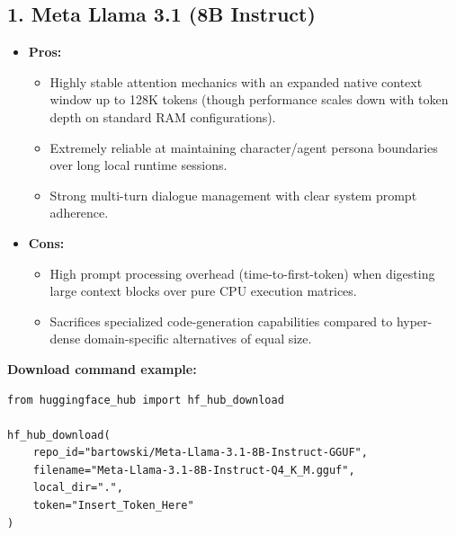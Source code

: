 \documentclass{article}
\begin{document}
\vspace{0.5cm}

\subsection*{1. Meta Llama 3.1 (8B Instruct)}
\begin{itemize}
    \item \textbf{Pros:}
    \begin{itemize}
        \item Highly stable attention mechanics with an expanded native context window up to 128K tokens (though performance scales down with token depth on standard RAM configurations).
        \item Extremely reliable at maintaining character/agent persona boundaries over long local runtime sessions.
        \item Strong multi-turn dialogue management with clear system prompt adherence.
    \end{itemize}
    \item \textbf{Cons:}
    \begin{itemize}
        \item High prompt processing overhead (time-to-first-token) when digesting large context blocks over pure CPU execution matrices.
        \item Sacrifices specialized code-generation capabilities compared to hyper-dense domain-specific alternatives of equal size.
    \end{itemize}
\end{itemize}

\noindent\textbf{Download command example:}
\begin{verbatim}
from huggingface_hub import hf_hub_download

hf_hub_download(
    repo_id="bartowski/Meta-Llama-3.1-8B-Instruct-GGUF",
    filename="Meta-Llama-3.1-8B-Instruct-Q4_K_M.gguf",
    local_dir=".",
    token="Insert_Token_Here"
)
\end{verbatim}
\end{document}
